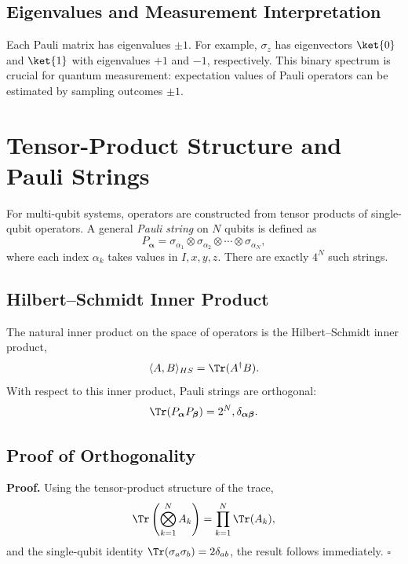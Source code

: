 \documentclass{book}
\begin{document}
\subsection{Eigenvalues and Measurement Interpretation}

Each Pauli matrix has eigenvalues $\pm1$. For example, $\sigma_z$ has eigenvectors $\ket{0}$ and $\ket{1}$ with eigenvalues $+1$ and $-1$, respectively. This binary spectrum is crucial for quantum measurement: expectation values of Pauli operators can be estimated by sampling outcomes $\pm1$.

\section{Tensor-Product Structure and Pauli Strings}

For multi-qubit systems, operators are constructed from tensor products of single-qubit operators. A general \emph{Pauli string} on $N$ qubits is defined as
\begin{equation}
P_{\boldsymbol{\alpha}} = \sigma_{\alpha_1} \otimes \sigma_{\alpha_2} \otimes \cdots \otimes \sigma_{\alpha_N},
\end{equation}
where each index $\alpha_k$ takes values in ${I,x,y,z}$. There are exactly $4^N$ such strings.

\subsection{Hilbert--Schmidt Inner Product}

The natural inner product on the space of operators is the Hilbert--Schmidt inner product,
\begin{equation}
\langle A, B \rangle_{HS} = \Tr(A^\dagger B).
\end{equation}
With respect to this inner product, Pauli strings are orthogonal:
\begin{equation}
\Tr(P_{\boldsymbol{\alpha}} P_{\boldsymbol{\beta}}) = 2^N , \delta_{\boldsymbol{\alpha}\boldsymbol{\beta}}.
\end{equation}

\subsection{Proof of Orthogonality}

\textbf{Proof.}
Using the tensor-product structure of the trace,
\begin{equation}
\Tr\left( \bigotimes_{k=1}^N A_k \right) = \prod_{k=1}^N \Tr(A_k),
\end{equation}
and the single-qubit identity $\Tr(\sigma_a \sigma_b) = 2\delta_{ab}$, the result follows immediately. \hfill $\square$
\end{document}
